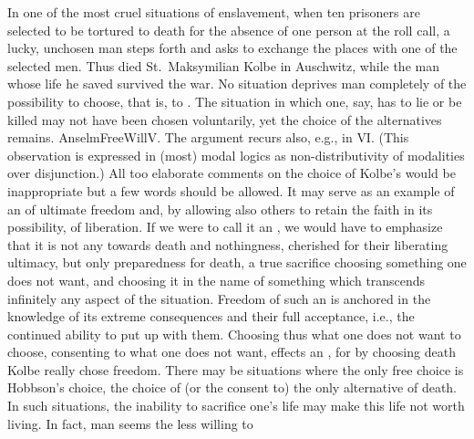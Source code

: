 In one of the most cruel situations of enslavement, when ten prisoners are
selected to be tortured to death for the absence of one person at the roll call,
a lucky, unchosen man steps forth and asks to exchange the places with one of the
selected men. Thus died St.~Maksymilian Kolbe in Auschwitz, while the man whose life
he saved survived the war.  No situation deprives man completely of the
possibility to choose, that is, to . The situation in which one, say,
has to lie or be killed may not have been chosen voluntarily, yet the choice of
the alternatives remains. \citet{Therefore although he either lies or is killed
  unwillingly, it does not follow that he lies unwillingly or is killed
  unwillingly.}{AnselmFreeWill}{V. The argument recurs also, e.g., in
  \citeauthor*{AnselmConcord}{VI}. (This observation is expressed in (most)
  modal logics as non-distributivity of modalities over disjunction.)}  All too
elaborate comments on the choice of Kolbe's would be inappropriate but a few
words should be allowed. It may serve as an example of an  of ultimate
freedom and, by allowing also others to retain the faith in its possibility, of
liberation.  If we were to call it an , we would
have to emphasize that it is not any  towards death and
nothingness, cherished for their liberating ultimacy, but only preparedness for
death, a true sacrifice choosing something one does not want, and choosing it in
the name of something which transcends infinitely any  aspect of the
situation. Freedom of such an  is anchored in the
knowledge of its extreme consequences and their full acceptance, i.e., the
continued ability to put up with them.  Choosing thus what one does not want to
choose, consenting to what one does not want, effects an , for by
choosing death Kolbe really chose freedom.  There may be situations where the
only free choice is Hobbson's choice, the choice of (or the consent to) the only
alternative of death. In such situations, the inability to sacrifice one's life
may make this life not worth living. In fact, man seems the less willing to
